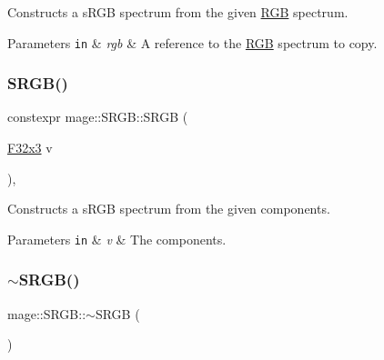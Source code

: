 Constructs a s\+R\+GB spectrum from the given \mbox{\hyperlink{structmage_1_1_r_g_b}{R\+GB}} spectrum.


\begin{DoxyParams}[1]{Parameters}
\mbox{\tt in}  & {\em rgb} & A reference to the \mbox{\hyperlink{structmage_1_1_r_g_b}{R\+GB}} spectrum to copy. \\
\hline
\end{DoxyParams}
\mbox{\label{structmage_1_1_s_r_g_b_abb02103839b539049a6dd54dd7936b16}} 
\subsubsection{\texorpdfstring{S\+R\+G\+B()}{SRGB()}\hspace{0.1cm}{\footnotesize\ttfamily [6/6]}}
{\footnotesize\ttfamily constexpr mage\+::\+S\+R\+G\+B\+::\+S\+R\+GB (\begin{DoxyParamCaption}\item[{\mbox{\hyperlink{namespacemage_a0fef5ab4e073c2d9ea876fefa3da4233}{F32x3}}}]{v }\end{DoxyParamCaption})\hspace{0.3cm}{\ttfamily [explicit]}, {\ttfamily [noexcept]}}

Constructs a s\+R\+GB spectrum from the given components.


\begin{DoxyParams}[1]{Parameters}
\mbox{\tt in}  & {\em v} & The components. \\
\hline
\end{DoxyParams}
\mbox{\label{structmage_1_1_s_r_g_b_aa5bb0738c6026da6c3e4f54869c52cbc}} 
\subsubsection{\texorpdfstring{$\sim$\+S\+R\+G\+B()}{~SRGB()}}
{\footnotesize\ttfamily mage\+::\+S\+R\+G\+B\+::$\sim$\+S\+R\+GB (\begin{DoxyParamCaption}{ }\end{DoxyParamCaption})\hspace{0.3cm}{\ttfamily [default]}}

